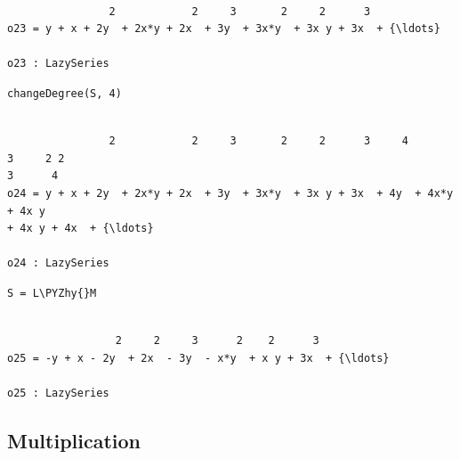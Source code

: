 \documentclass[11pt]{article}
\makeatletter
\def\PYZhy{\char`\-}
\newcommand{\boxspacing}{\kern\kvtcb@left@rule\kern\kvtcb@boxsep}
\newcommand{\prompt}[4]{
        {\ttfamily\llap{{\color{#2}[#3]:\hspace{3pt}#4}}\vspace{-\baselineskip}}
    }
\makeatother
\begin{document}
    \begin{Verbatim}[commandchars=\\\{\}]

                2            2     3       2     2      3
o23 = y + x + 2y  + 2x*y + 2x  + 3y  + 3x*y  + 3x y + 3x  + {\ldots}

o23 : LazySeries
    \end{Verbatim}

    \begin{tcolorbox}[breakable, size=fbox, boxrule=1pt, pad at break*=1mm,colback=cellbackground, colframe=cellborder]
\prompt{In}{incolor}{24}{\boxspacing}
\begin{Verbatim}[commandchars=\\\{\}]
changeDegree(S, 4)
\end{Verbatim}
\end{tcolorbox}

    \begin{Verbatim}[commandchars=\\\{\}]

                2            2     3       2     2      3     4       3     2 2
3      4
o24 = y + x + 2y  + 2x*y + 2x  + 3y  + 3x*y  + 3x y + 3x  + 4y  + 4x*y  + 4x y
+ 4x y + 4x  + {\ldots}

o24 : LazySeries
    \end{Verbatim}

    \begin{tcolorbox}[breakable, size=fbox, boxrule=1pt, pad at break*=1mm,colback=cellbackground, colframe=cellborder]
\prompt{In}{incolor}{25}{\boxspacing}
\begin{Verbatim}[commandchars=\\\{\}]
S = L\PYZhy{}M
\end{Verbatim}
\end{tcolorbox}

    \begin{Verbatim}[commandchars=\\\{\}]

                 2     2     3      2    2      3
o25 = -y + x - 2y  + 2x  - 3y  - x*y  + x y + 3x  + {\ldots}

o25 : LazySeries
    \end{Verbatim}

    \hypertarget{multiplication}{%
\subsection{Multiplication}\label{multiplication}}
\end{document}
